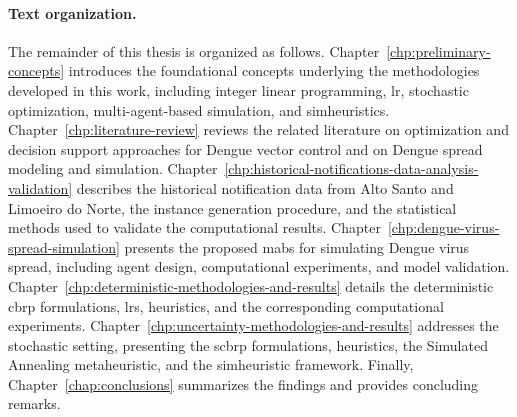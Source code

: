 \paragraph{Text organization.} The remainder of this thesis is organized as
follows. Chapter~\ref{chp:preliminary-concepts} introduces the foundational
concepts underlying the methodologies developed in this work, including integer
linear programming, \gls{lr}, stochastic optimization, multi-agent-based
simulation, and simheuristics. Chapter~\ref{chp:literature-review} reviews the
related literature on optimization and decision support approaches for Dengue
vector control and on Dengue spread modeling and simulation.
Chapter~\ref{chp:historical-notifications-data-analysis-validation} describes
the historical notification data from Alto Santo and Limoeiro do Norte, the
instance generation procedure, and the statistical methods used to validate the
computational results. Chapter~\ref{chp:dengue-virus-spread-simulation}
presents the proposed \gls{mabs} for simulating Dengue virus spread, including
agent design, computational experiments, and model validation.
Chapter~\ref{chp:deterministic-methodologies-and-results} details the
deterministic \gls{cbrp} formulations, \gls{lrs}, heuristics,
and the corresponding computational experiments.
Chapter~\ref{chp:uncertainty-methodologies-and-results} addresses the
stochastic setting, presenting the \gls{scbrp} formulations, heuristics, the
Simulated Annealing metaheuristic, and the simheuristic framework. Finally,
Chapter~\ref{chap:conclusions} summarizes the findings and provides concluding
remarks.
